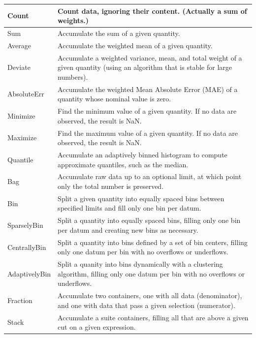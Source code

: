 \documentclass{beamer}
\begin{document}
\begin{frame}
\vspace{0.3 cm}
\hspace{-0.5 cm}\begin{minipage}{\linewidth}
\tiny
\renewcommand{\arraystretch}{1.3}
\begin{tabular}{| p{0.1\linewidth} p{0.9\linewidth} |}\hline
Count           & Count data, ignoring their content. (Actually a sum of weights.) \\\hline
Sum             & Accumulate the sum of a given quantity. \\
Average         & Accumulate the weighted mean of a given quantity. \\
Deviate         & Accumulate a weighted variance, mean, and total weight of a given quantity (using an algorithm that is stable for large numbers). \\
AbsoluteErr     & Accumulate the weighted Mean Absolute Error (MAE) of a quantity whose nominal value is zero. \\
Minimize        & Find the minimum value of a given quantity. If no data are observed, the result is NaN. \\
Maximize        & Find the maximum value of a given quantity. If no data are observed, the result is NaN. \\
Quantile        & Accumulate an adaptively binned histogram to compute approximate quantiles, such as the median. \\\hline
Bag             & Accumulate raw data up to an optional limit, at which point only the total number is preserved. \\\hline
Bin             & Split a given quantity into equally spaced bins between specified limits and fill only one bin per datum. \\
SparselyBin     & Split a quantity into equally spaced bins, filling only one bin per datum and creating new bins as necessary. \\
CentrallyBin    & Split a quantity into bins defined by a set of bin centers, filling only one datum per bin with no overflows or underflows. \\
AdaptivelyBin   & Split a quanity into bins dynamically with a clustering algorithm, filling only one datum per bin with no overflows or underflows. \\\hline
Fraction        & Accumulate two containers, one with all data (denominator), and one with data that pass a given selection (numerator). \\
Stack           & Accumulate a suite containers, filling all that are above a given cut on a given expression. \\

\end{tabular}
\end{minipage}
\end{frame}
\end{document}
